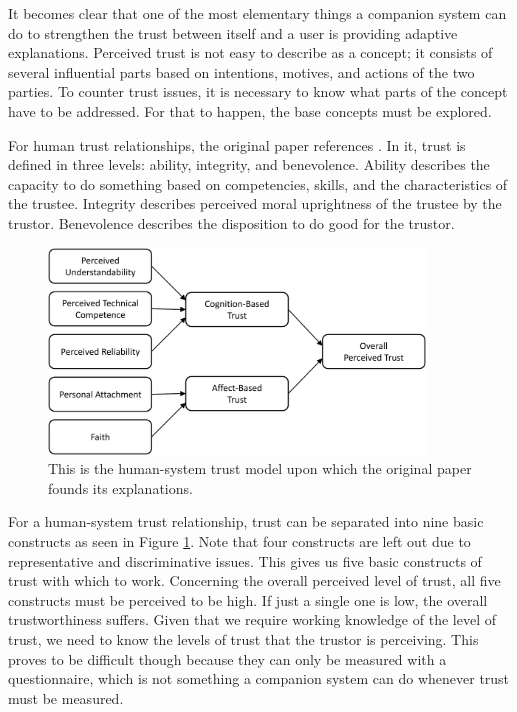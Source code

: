 \documentclass[a4paper]{article}
\begin{document}
It becomes clear that one of the most elementary things a companion system can do to strengthen the trust between itself and a user is providing adaptive explanations. Perceived trust is not easy to describe as a concept; it consists of several influential parts based on intentions, motives, and actions of the two parties. To counter trust issues, it is necessary to know what parts of the concept have to be addressed. For that to happen, the base concepts must be explored.

For human trust relationships, the original paper references \cite{htc}. In it, trust is defined in three levels: ability, integrity, and benevolence. Ability describes the capacity to do something based on competencies, skills, and the characteristics of the trustee. Integrity describes perceived moral uprightness of the trustee by the trustor. Benevolence describes the disposition to do good for the trustor.

\begin{figure}[H]
	\centering
	\includegraphics[width=10cm]{trust.png}
	\caption{This is the human-system trust model upon which the original paper founds its explanations.}
	\label{fig:hs_trust}
\end{figure}

For a human-system trust relationship, trust can be separated into nine basic constructs as seen in Figure \ref{fig:hs_trust}. Note that four constructs are left out due to representative and discriminative issues. This gives us five basic constructs of trust with which to work. Concerning the overall perceived level of trust, all five constructs must be perceived to be high. If just a single one is low, the overall trustworthiness suffers. Given that we require working knowledge of the level of trust, we need to know the levels of trust that the trustor is perceiving. This proves to be difficult though because they can only be measured with a questionnaire, which is not something a companion system can do whenever trust must be measured.
\end{document}
